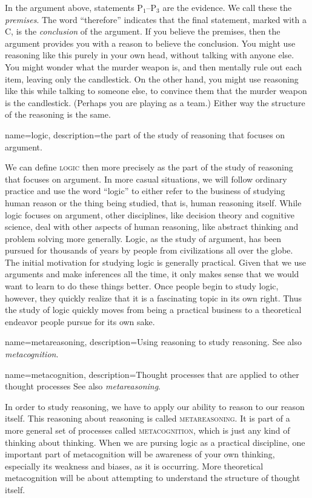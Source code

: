 In the argument above, statements P$_1$--P$_3$ are the evidence. We call these the \emph{premises}. The word ``therefore'' indicates that the final statement, marked with a C, is the \emph{conclusion} of the argument. If you believe the premises, then the argument provides you with a reason to believe the conclusion. You might use reasoning like this purely in your own head, without talking with anyone else. You might wonder what the murder weapon is, and then mentally rule out each item, leaving only the candlestick. On the other hand, you might use reasoning like this while talking to someone else, to convince them that the murder weapon is the candlestick. (Perhaps you are playing as a team.) Either way the structure of the reasoning is the same. 

{
name=logic,
description={the part of the study of reasoning that focuses on argument.}
}

We can define \textsc{\Gls{logic}}\label{def:logic} then more precisely as the part of the study of reasoning that focuses on argument. In more casual situations, we will follow ordinary practice and use the word ``logic'' to either refer to the business of studying human reason or the thing being studied, that is, human reasoning itself. While logic focuses on argument, other disciplines, like decision theory and cognitive science, deal with other aspects of human reasoning, like abstract thinking and problem solving more generally. Logic, as the study of argument, has been pursued for thousands of years by people from civilizations all over the globe. The initial motivation for studying logic is generally practical. Given that we use arguments and make inferences all the time, it only makes sense that we would want to learn to do these things better.  Once people begin to study logic, however, they quickly realize that it is a fascinating topic in its own right. Thus the study of logic quickly moves from being a practical business to a theoretical endeavor people pursue for its own sake. 

{
name=metareasoning,
description={Using reasoning to study reasoning. See also \emph{metacognition}.}
}

{
name=metacognition,
description={Thought processes that are applied to other thought processes See also \emph{metareasoning}.}
}

In order to study reasoning, we have to apply our ability to reason to our reason itself. This reasoning about reasoning is called \textsc{\gls{metareasoning}}\label{def:Metareasoning}. It is part of a more general set of processes called \textsc{\gls{metacognition}}\label{def:Metacognition}, which is just any kind of thinking about thinking. When we are pursing logic as a practical discipline, one important part of metacognition will be awareness of your own thinking, especially its weakness and biases, as it is occurring. More theoretical metacognition will be about attempting to understand the structure of thought itself. 



